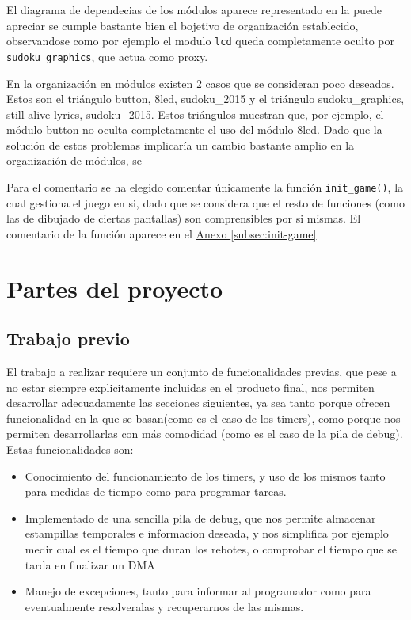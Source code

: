 \documentclass[12pt,letterpaper]{article}
\begin{document}
El diagrama de dependecias de los módulos aparece representado en la
puede apreciar se cumple bastante bien el bojetivo de organización
establecido, observandose como por ejemplo el modulo \texttt{lcd}
queda completamente oculto por \texttt{sudoku\_graphics}, que actua
como proxy.

En la organización en módulos existen 2 casos que se consideran poco
deseados. Estos son el triángulo button, 8led, sudoku\_2015 y el
triángulo sudoku\_graphics, still-alive-lyrics, sudoku\_2015. Estos
triángulos muestran que, por ejemplo, el módulo button no oculta
completamente el uso del módulo 8led. Dado que la solución de estos
problemas implicaría un cambio bastante amplio en la organización de módulos, se 

Para el comentario se ha elegido comentar únicamente la función
\texttt{init\_game()}, la cual gestiona el juego en si, dado que se
considera que el resto de funciones (como las de dibujado de ciertas
pantallas) son comprensibles por si mismas. El comentario de la
función aparece en el \hyperref[subsec:init-game]{Anexo
  \ref*{subsec:init-game}}

\section{Partes del proyecto}
\label{sec:partes}

\subsection{Trabajo previo}
\label{subsec:previous}

El trabajo a realizar requiere un conjunto de funcionalidades previas,
que pese a no estar siempre explicitamente incluidas en el producto
final, nos permiten desarrollar adecuadamente las secciones
siguientes, ya sea tanto porque ofrecen funcionalidad en la que se
basan(como es el caso de los \hyperref[subsubsec:timers]{timers}),
como porque nos permiten desarrollarlas con más comodidad (como es el
caso de la \hyperref[subsubsec:pila-debug]{pila de debug}). Estas
funcionalidades son:
\begin{itemize}
  \item Conocimiento del funcionamiento de los timers, y uso de los
    mismos tanto para medidas de tiempo como para programar tareas.
  \item Implementado de una sencilla pila de debug, que nos permite
    almacenar estampillas temporales e informacion deseada, y nos
    simplifica por ejemplo medir cual es el tiempo que duran los
    rebotes, o comprobar el tiempo que se tarda en finalizar un DMA
  \item Manejo de excepciones, tanto para informar al programador como
    para eventualmente resolveralas y recuperarnos de las mismas.
\end{itemize}
\end{document}
